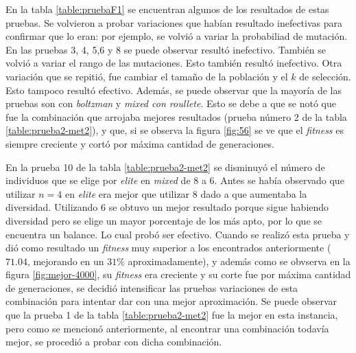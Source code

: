 \documentclass[11pt,a4paper]{article}
\begin{document}
En la tabla \ref{table:pruebaF1} se encuentran algunos de los resultados de estas pruebas. Se volvieron a probar variaciones que habían resultado inefectivas para confirmar que lo eran: por ejemplo, se volvió a variar la probabiliad de mutación. En las pruebas 3, 4, 5,6 y 8 se puede observar resultó inefectivo. También se volvió  a variar el rango de las mutaciones. Esto también resultó inefectivo. Otra variación que se repitió, fue cambiar el tamaño de la población y el $k$ de selección. Esto tampoco resultó efectivo. Además, se puede observar que la mayoría de las pruebas son con \emph{boltzman} y \emph{mixed con roullete}. Esto se debe a que se notó que fue la combinación que arrojaba mejores resultados (prueba número 2 de la tabla \ref{table:prueba2-met2}), y que, si se observa la figura \ref{fig:56} se ve que el \emph{fitness} es siempre creciente y cortó por máxima cantidad de generaciones. 

En la prueba 10 de la tabla \ref{table:prueba2-met2} se disminuyó el número de individuos que se elige por \emph{elite} en \emph{mixed} de $8$ a $6$. Antes se había observado que utilizar $n=4$ en \emph{elite} era mejor que utilizar $8$ dado a que aumentaba la diversidad. Utilizando $6$ se obtuvo un mejor resultado porque sigue habiendo diversidad pero se elige un mayor porcentaje de los más apto, por lo que se encuentra un balance. Lo cual probó  ser efectivo. Cuando se realizó esta prueba y dió como resultado un \emph{fitness} muy superior a los encontrados anteriormente ($71.04$, mejorando en un $31 \% $ aproximadamente), y además como se obvserva en la figura \ref{fig:mejor-4000}, su \emph{fitness} era creciente y su corte fue por máxima cantidad de generaciones, se decidió intensificar las pruebas variaciones de esta combinación para intentar dar con una mejor aproximación. Se puede observar que la prueba 1 de la tabla \ref{table:prueba2-met2} fue la mejor en esta instancia, pero como se mencionó anteriormente, al encontrar una combinación todavía mejor, se procedió a probar con dicha combinación.
\end{document}
